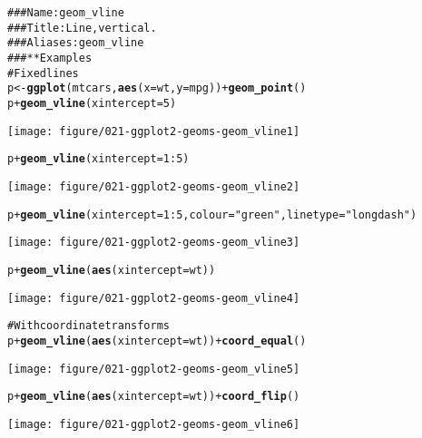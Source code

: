 \documentclass[a4paper,titlepage]{tufte-handout}\usepackage{graphicx, color}
\makeatletter
\def\maxwidth{ %
  \ifdim\Gin@nat@width>\linewidth
    \linewidth
  \else
    \Gin@nat@width
  \fi
}
\newcommand{\hlfunctioncall}[1]{\textcolor[rgb]{0.501960784313725,0,0.329411764705882}{\textbf{#1}}}%
\newcommand{\hlstring}[1]{\textcolor[rgb]{0.6,0.6,1}{#1}}%
\newcommand{\hlcomment}[1]{\textcolor[rgb]{0.180392156862745,0.6,0.341176470588235}{#1}}%
\newenvironment{kframe}{%
 \def\at@end@of@kframe{}%
 \ifinner\ifhmode%
  \def\at@end@of@kframe{\end{minipage}}%
  \begin{minipage}{\columnwidth}%
 \fi\fi%
 \def\FrameCommand##1{\hskip\@totalleftmargin \hskip-\fboxsep
 \colorbox{shadecolor}{##1}\hskip-\fboxsep
     \hskip-\linewidth \hskip-\@totalleftmargin \hskip\columnwidth}%
 \MakeFramed {\advance\hsize-\width
   \@totalleftmargin\z@ \linewidth\hsize
   \@setminipage}}%
 {\par\unskip\endMakeFramed%
 \at@end@of@kframe}
\newenvironment{knitrout}{}{} %
\makeatother
\begin{document}
\begin{knitrout}
\color{fgcolor}\begin{kframe}
\begin{alltt}
\hlcomment{### Name: geom_vline}
\hlcomment{### Title: Line, vertical.}
\hlcomment{### Aliases: geom_vline}
\hlcomment{### ** Examples}
\hlcomment{# Fixed lines}
p <- \hlfunctioncall{ggplot}(mtcars, \hlfunctioncall{aes}(x = wt, y = mpg)) + \hlfunctioncall{geom_point}()
p + \hlfunctioncall{geom_vline}(xintercept = 5)
\end{alltt}
\end{kframe}\texttt{[image: figure/021-ggplot2-geoms-geom\_vline1]} \begin{kframe}\begin{alltt}
p + \hlfunctioncall{geom_vline}(xintercept = 1:5)
\end{alltt}
\end{kframe}\texttt{[image: figure/021-ggplot2-geoms-geom\_vline2]} \begin{kframe}\begin{alltt}
p + \hlfunctioncall{geom_vline}(xintercept = 1:5, colour=\hlstring{"green"}, linetype = \hlstring{"longdash"})
\end{alltt}
\end{kframe}\texttt{[image: figure/021-ggplot2-geoms-geom\_vline3]} \begin{kframe}\begin{alltt}
p + \hlfunctioncall{geom_vline}(\hlfunctioncall{aes}(xintercept = wt))
\end{alltt}
\end{kframe}\texttt{[image: figure/021-ggplot2-geoms-geom\_vline4]} \begin{kframe}\begin{alltt}
\hlcomment{# With coordinate transforms}
p + \hlfunctioncall{geom_vline}(\hlfunctioncall{aes}(xintercept = wt)) + \hlfunctioncall{coord_equal}()
\end{alltt}
\end{kframe}\texttt{[image: figure/021-ggplot2-geoms-geom\_vline5]} \begin{kframe}\begin{alltt}
p + \hlfunctioncall{geom_vline}(\hlfunctioncall{aes}(xintercept = wt)) + \hlfunctioncall{coord_flip}()
\end{alltt}
\end{kframe}\texttt{[image: figure/021-ggplot2-geoms-geom\_vline6]} \begin{kframe}\begin{alltt}

\end{alltt}
\end{kframe}
\end{knitrout}
\end{document}
